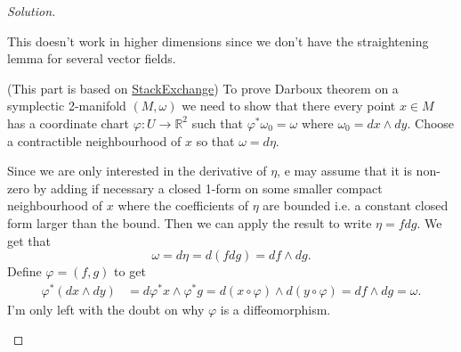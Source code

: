 \begin{proof}[Solution]
\begin{enumerate}[label=\alph*.]
		\begin{remark}
			This doesn't work in higher dimensions since we don't have the straightening lemma for several vector fields.
		\end{remark}

		(This part is based on \href{https://math.stackexchange.com/questions/2853901/darboux-theorem-for-2-dimensional-manifolds}{StackExchange}) To prove Darboux theorem on a symplectic 2-manifold $(M,\omega)$ we need to show that there every point $x \in M$ has a coordinate chart $\varphi :U\to \mathbb{R}^{2}$ such that $\varphi^*\omega_0=\omega$ where $\omega_0=dx\wedge dy$. Choose a contractible neighbourhood of $x$ so that  $\omega=d\eta$.

		Since we are only interested in the derivative of $\eta$, e may assume that it is non-zero by adding if necessary a closed 1-form on some smaller compact neighbourhood of $x$ where the coefficients of $\eta$ are bounded i.e. a constant closed form larger than the bound. Then we can apply the result to write $\eta=fdg$. We get that
		\[\omega=d\eta=d(fdg)=df\wedge dg.\]
		Define $\varphi=(f,g)$ to get
		\begin{align*}
			\varphi^*(dx\wedge dy)&=d\varphi^*x\wedge \varphi^*g=d(x\circ \varphi)\wedge d(y\circ \varphi)=df\wedge dg=\omega.
		\end{align*}
		I'm only left with the doubt on why $\varphi$ is a diffeomorphism.

	\end{enumerate}
\end{proof}

\printbibliography


